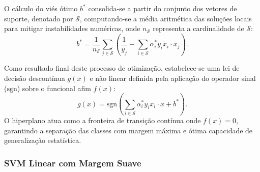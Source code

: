 \documentclass[12pt, a4paper]{article}
\theoremstyle{plain}
\theoremstyle{definition}
\theoremstyle{remark}
\newcommand{\ident}{\hspace{2em}}
\begin{document}
\ident O cálculo do viés ótimo $b^*$ consolida-se a partir do conjunto dos vetores de suporte, denotado por $\mathcal{S}$, computando-se a média aritmética das soluções locais para mitigar instabilidades numéricas, onde $n_{\mathcal{S}}$ representa a cardinalidade de $\mathcal{S}$:
\begin{equation*}
    b^* = \frac{1}{n_{\mathcal{S}}} \sum_{j \in \mathcal{S}} \left( \frac{1}{y_j} - \sum_{i \in \mathcal{S}} \alpha_i^* y_i x_i \cdot x_j \right).
\end{equation*}

\ident Como resultado final deste processo de otimização, estabelece-se uma lei de decisão descontínua $g(x)$ e não linear definida pela aplicação do operador sinal ($\text{sgn}$) sobre o funcional afim $f(x)$:
\begin{equation*}
    g(x) = \text{sgn}\left( \sum_{i \in \mathcal{S}} \alpha_i^* y_i x_i\cdot x + b^* \right).
\end{equation*}
O hiperplano atua como a fronteira de transição contínua onde $f(x) = 0$, garantindo a separação das classes com margem máxima e ótima capacidade de generalização estatística.

\subsubsection{SVM Linear com Margem Suave}
\end{document}
